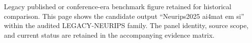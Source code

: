 Legacy published or conference-era benchmark figure retained for historical comparison. This page shows the candidate output ``Neurips2025 ai4mat em si'' within the audited LEGACY-NEURIPS family. The panel identity, source scope, and current status are retained in the accompanying evidence matrix.
